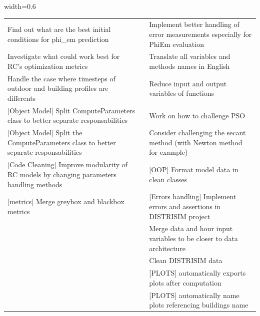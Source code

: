 \begin{table}[H]
\begin{adjustbox}{width=0.6\textwidth}
\begin{tabular}{p{5cm}p{5cm}p{8cm}}
                Find out what are the best initial conditions for phi\_em prediction
                &
                &
                Implement better handling of error measurements especially for PhiEm evaluation \\

                Investigate what could work best for RC's optimization metrics
                &
                &
                Translate all variables and methods names in English \\

                Handle the case where timesteps of outdoor and building profiles are differents
                &
                &
                Reduce input and output variables of functions \\

                {[Object Model]} Split ComputeParameters class to better separate responsabilities
                &
                &
                Work on how to challenge PSO \\

                {[Object Model]} Split the ComputeParameters class to better separate responsabilities
                &
                &
                Consider challenging the secant method (with Newton method for example) \\

                {[Code Cleaning]} Improve modularity of RC models by changing parameters handling methods
                &
                &
                    {[OOP]} Format model data in clean classes \\

                {[metrics]} Merge greybox and blackbox metrics
                &
                &
                    {[Errors handling]} Implement errors and assertions in DISTRISIM project \\

                &
                &
                Merge data and hour input variables to be closer to data architecture \\

                &
                &
                Clean DISTRISIM data \\

                &
                &
                    {[PLOTS]} automatically exports plots after computation \\

                &
                &
                    {[PLOTS]} automatically name plots referencing buildings name \\


\end{tabular}
\end{adjustbox}
\end{table}
